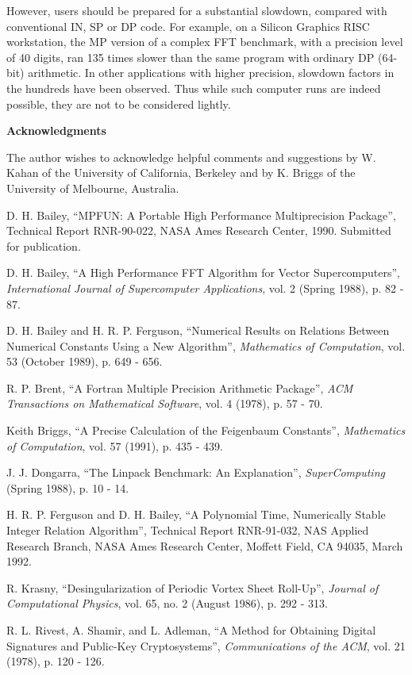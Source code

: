 However, users should be prepared for a substantial slowdown, compared
with conventional IN, SP or DP code.  For example, on a Silicon
Graphics RISC workstation, the MP version of a complex FFT benchmark,
with a precision level of 40 digits, ran 135 times slower than the
same program with ordinary DP (64-bit) arithmetic.  In other
applications with higher precision, slowdown factors in the hundreds
have been observed.  Thus while such computer runs are indeed
possible, they are not to be considered lightly.

\vspace{2ex} \noindent
{\bf Acknowledgments}

The author wishes to acknowledge helpful comments and suggestions by
W. Kahan of the University of California, Berkeley and by K. Briggs of
the University of Melbourne, Australia.

\newpage

\begin{thebibliography}{9}

 D. H. Bailey, ``MPFUN: A Portable High Performance
Multiprecision Package'', Technical Report RNR-90-022, NASA Ames
Research Center, 1990.  Submitted for publication.

 D. H. Bailey, ``A High Performance FFT Algorithm for
Vector Supercomputers'', {\sl International Journal of Supercomputer
Applications}, vol. 2 (Spring 1988), p. 82 - 87.

 D. H. Bailey and H. R. P. Ferguson, ``Numerical
Results on Relations Between Numerical Constants Using a New
Algorithm'', {\sl Mathematics of Computation}, vol. 53 (October 1989),
p. 649 - 656.

 R. P. Brent, ``A Fortran Multiple Precision Arithmetic
Package'', {\sl ACM Transactions on Mathematical Software}, vol. 4
(1978), p. 57 - 70.

 Keith Briggs, ``A Precise Calculation of the
Feigenbaum Constants'', {\sl Mathematics of Computation}, vol. 57
(1991), p.  435 - 439.

 J. J. Dongarra, ``The Linpack Benchmark: An
Explanation'', {\sl SuperComputing} (Spring 1988), p. 10 - 14. 

 H. R. P. Ferguson and D. H. Bailey, ``A Polynomial
Time, Numerically Stable Integer Relation Algorithm'', Technical
Report RNR-91-032, NAS Applied Research Branch, NASA Ames Research
Center, Moffett Field, CA 94035, March 1992.

 R. Krasny, ``Desingularization of Periodic Vortex
Sheet Roll-Up'', {\sl Journal of Computational Physics}, vol.  65, no.
2 (August 1986), p. 292 - 313.

 R. L. Rivest, A. Shamir, and L. Adleman, ``A Method for
Obtaining Digital Signatures and Public-Key Cryptosystems'', {\sl
Communications of the ACM}, vol. 21 (1978), p.  120 - 126.

\end{thebibliography}


